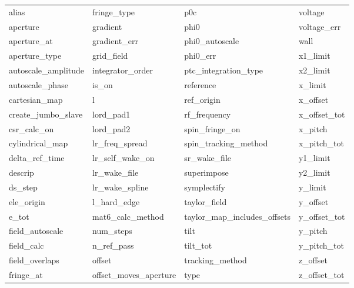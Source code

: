  \begin{tabular}{llll} \toprule
alias                       & fringe_type                 & p0c                         & voltage                     \\
aperture                    & gradient                    & phi0                        & voltage_err                 \\
aperture_at                 & gradient_err                & phi0_autoscale              & wall                        \\
aperture_type               & grid_field                  & phi0_err                    & x1_limit                    \\
autoscale_amplitude         & integrator_order            & ptc_integration_type        & x2_limit                    \\
autoscale_phase             & is_on                       & reference                   & x_limit                     \\
cartesian_map               & l                           & ref_origin                  & x_offset                    \\
create_jumbo_slave          & lord_pad1                   & rf_frequency                & x_offset_tot                \\
csr_calc_on                 & lord_pad2                   & spin_fringe_on              & x_pitch                     \\
cylindrical_map             & lr_freq_spread              & spin_tracking_method        & x_pitch_tot                 \\
delta_ref_time              & lr_self_wake_on             & sr_wake_file                & y1_limit                    \\
descrip                     & lr_wake_file                & superimpose                 & y2_limit                    \\
ds_step                     & lr_wake_spline              & symplectify                 & y_limit                     \\
ele_origin                  & l_hard_edge                 & taylor_field                & y_offset                    \\
e_tot                       & mat6_calc_method            & taylor_map_includes_offsets & y_offset_tot                \\
field_autoscale             & num_steps                   & tilt                        & y_pitch                     \\
field_calc                  & n_ref_pass                  & tilt_tot                    & y_pitch_tot                 \\
field_overlaps              & offset                      & tracking_method             & z_offset                    \\
fringe_at                   & offset_moves_aperture       & type                        & z_offset_tot                \\
 \bottomrule
 \end{tabular}
 \vfill
 
